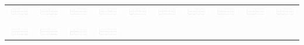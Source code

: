 \documentclass[]{article}
\begin{document}
\begin{table}[h]
\begin{tabular}{| c | c | c | c | c | c | c | c | c | c |}
		\includegraphics[width=0.09\linewidth]{0.40_0.00.png} &
		\includegraphics[width=0.09\linewidth]{0.40_0.10.png} &
		\includegraphics[width=0.09\linewidth]{0.40_0.20.png} &
		\includegraphics[width=0.09\linewidth]{0.40_0.30.png} &
		\includegraphics[width=0.09\linewidth]{0.40_0.40.png} &
		\includegraphics[width=0.09\linewidth]{0.40_0.50.png} &
		\includegraphics[width=0.09\linewidth]{0.40_0.60.png} &
		\includegraphics[width=0.09\linewidth]{0.40_0.70.png} &
		\includegraphics[width=0.09\linewidth]{0.40_0.80.png} &
		\includegraphics[width=0.09\linewidth]{0.40_0.90.png} \\
		& & & & & & & & & \\
		\hline
		& & & & & & & & & \\
		\includegraphics[width=0.09\linewidth]{0.50_0.00.png} &
		\includegraphics[width=0.09\linewidth]{0.50_0.10.png} &
		\includegraphics[width=0.09\linewidth]{0.50_0.20.png} &
		\includegraphics[width=0.09\linewidth]{0.50_0.30.png} &

\end{tabular}
\end{table}
\end{document}
